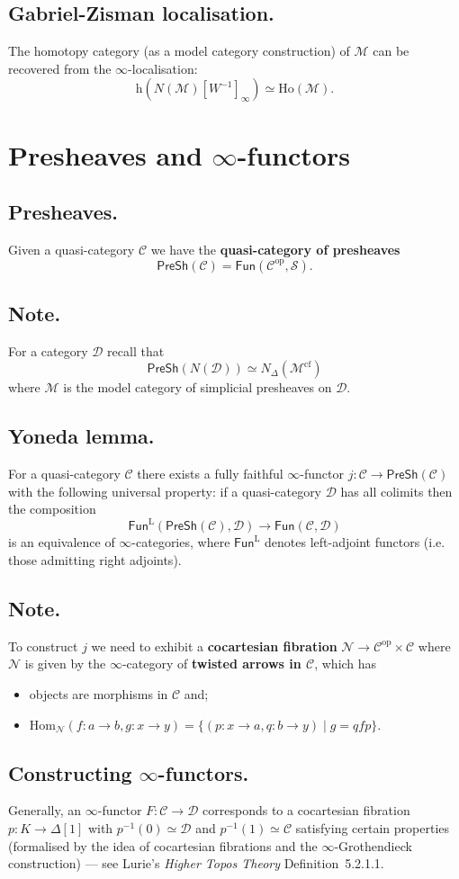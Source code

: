 \documentclass{article}
\numberwithin{equation}{subsection}
\renewcommand{\ss}[1]{\subsection{#1}}
\newcommand{\Hom}{\mathrm{Hom}}
\newcommand{\C}{\mathcal{C}}
\newcommand{\D}{\mathcal{D}}
\newcommand{\M}{\mathcal{M}}
\newcommand{\N}{\mathcal{N}}
\newcommand{\h}{\mathrm{h}}
\renewcommand{\S}{\mathcal{S}}
\renewcommand{\P}{\mathsf{PreSh}}
\begin{document}
        \ss{Gabriel-Zisman localisation.}
            The homotopy category (as a model category construction) of $\M$ can be recovered from the $\infty$-localisation:
            \[
                \h(N(\M)[W^{-1}]_\infty) \simeq \mathrm{Ho}(\M).
            \]

    \section{Presheaves and $\infty$-functors}

        \ss{Presheaves.}
            Given a quasi-category $\C$ we have the \textbf{quasi-category of presheaves}
            \[
                \P(\C) = \mathsf{Fun}(\C^\mathrm{op},\S).
            \]

        \ss{Note.}
            For a category $\D$ recall that
            \[
                \P(N(\D)) \simeq N_\Delta(\M^\mathrm{cf})
            \]
            where $\M$ is the model category of simplicial presheaves on $\D$.

        \ss{Yoneda lemma.}
            For a quasi-category $\C$ there exists a fully faithful $\infty$-functor $j\colon\C\to\P(\C)$ with the following universal property: if a quasi-category $\D$ has all colimits then the composition
            \[
                \mathsf{Fun}^\mathrm{L}(\P(\C),\D) \to \mathsf{Fun}(\C,\D)
            \]
            is an equivalence of $\infty$-categories, where $\mathsf{Fun}^\mathrm{L}$ denotes left-adjoint functors (i.e. those admitting right adjoints).

        \ss{Note.}
            To construct $j$ we need to exhibit a \textbf{cocartesian fibration} $\N\to\C^\mathrm{op}\times\C$ where $\N$ is given by the $\infty$-category of \textbf{twisted arrows in $\C$}, which has
            \begin{itemize}
                \item objects are morphisms in $\C$ and;
                \item $\Hom_\N(f\colon a\to b,g\colon x\to y)=\{(p\colon x\to a,q\colon b\to y) \mid g=qfp\}$.
            \end{itemize}

        \ss{Constructing $\infty$-functors.}
            Generally, an $\infty$-functor $F\colon\C\to\D$ corresponds to a cocartesian fibration $p\colon K\to\Delta[1]$ with $p^{-1}(0)\simeq\D$ and $p^{-1}(1)\simeq\C$ satisfying certain properties (formalised by the idea of cocartesian fibrations and the $\infty$-Grothendieck construction) --- see Lurie's \emph{Higher Topos Theory} Definition~5.2.1.1.
\end{document}
